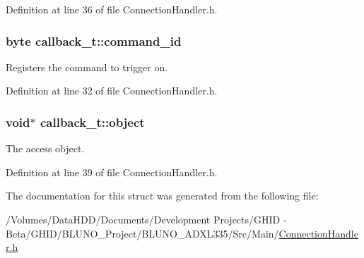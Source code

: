 \-Definition at line 36 of file \-Connection\-Handler.\-h.

\hypertarget{structcallback__t_ada2c0e2a936e49f0ece582c40953c278}{
\subsubsection[{command\-\_\-id}]{\setlength{\rightskip}{0pt plus 5cm}byte {\bf callback\-\_\-t\-::command\-\_\-id}}}\label{structcallback__t_ada2c0e2a936e49f0ece582c40953c278}


\-Registers the command to trigger on. 



\-Definition at line 32 of file \-Connection\-Handler.\-h.

\hypertarget{structcallback__t_a30ed93032c0a2ead09070156d7c37790}{
\subsubsection[{object}]{\setlength{\rightskip}{0pt plus 5cm}void$\ast$ {\bf callback\-\_\-t\-::object}}}\label{structcallback__t_a30ed93032c0a2ead09070156d7c37790}


\-The access object. 



\-Definition at line 39 of file \-Connection\-Handler.\-h.



\-The documentation for this struct was generated from the following file\-:\begin{DoxyCompactItemize}
\item 
/\-Volumes/\-Data\-H\-D\-D/\-Documents/\-Development Projects/\-G\-H\-I\-D -\/ Beta/\-G\-H\-I\-D/\-B\-L\-U\-N\-O\-\_\-\-Project/\-B\-L\-U\-N\-O\-\_\-\-A\-D\-X\-L335/\-Src/\-Main/\hyperlink{_connection_handler_8h}{\-Connection\-Handler.\-h}\end{DoxyCompactItemize}
